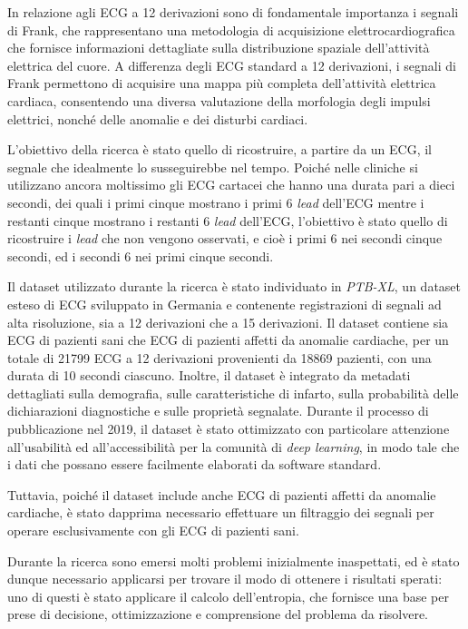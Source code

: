 In relazione agli ECG a 12 derivazioni sono di fondamentale importanza i segnali di Frank, che rappresentano una metodologia di acquisizione elettrocardiografica che fornisce informazioni dettagliate sulla distribuzione spaziale dell'attività elettrica del cuore. A differenza degli ECG standard a 12 derivazioni, i segnali di Frank permettono di acquisire una mappa più completa dell'attività elettrica cardiaca, consentendo una diversa valutazione della morfologia degli impulsi elettrici, nonché delle anomalie e dei disturbi cardiaci.

L'obiettivo della ricerca è stato quello di ricostruire, a partire da un ECG, il segnale che idealmente lo susseguirebbe nel tempo. Poiché nelle cliniche si utilizzano ancora moltissimo gli ECG cartacei che hanno una durata pari a dieci secondi, dei quali i primi cinque mostrano i primi 6 \textit{lead} dell'ECG mentre i restanti cinque mostrano i restanti 6 \textit{lead} dell'ECG, l'obiettivo è stato quello di ricostruire i \textit{lead} che non vengono osservati, e cioè i primi 6 nei secondi cinque secondi, ed i secondi 6 nei primi cinque secondi.

Il dataset utilizzato durante la ricerca è stato individuato in \textit{PTB-XL}, un dataset esteso di ECG sviluppato in Germania e contenente registrazioni di segnali ad alta risoluzione, sia a 12 derivazioni che a 15 derivazioni. Il dataset contiene sia ECG di pazienti sani che ECG di pazienti affetti da anomalie cardiache, per un totale di 21799 ECG a 12 derivazioni provenienti da 18869 pazienti, con una durata di 10 secondi ciascuno. Inoltre, il dataset è integrato da metadati dettagliati sulla demografia, sulle caratteristiche di infarto, sulla probabilità delle dichiarazioni diagnostiche e sulle proprietà segnalate. Durante il processo di pubblicazione nel 2019, il dataset è stato ottimizzato con particolare attenzione all'usabilità ed all'accessibilità per la comunità di \textit{deep learning}, in modo tale che i dati che possano essere facilmente elaborati da software standard.

Tuttavia, poiché il dataset include anche ECG di pazienti affetti da anomalie cardiache, è stato dapprima necessario effettuare un filtraggio dei segnali per operare esclusivamente con gli ECG di pazienti sani.

Durante la ricerca sono emersi molti problemi inizialmente inaspettati, ed è stato dunque necessario applicarsi per trovare il modo di ottenere i risultati sperati: uno di questi è stato applicare il calcolo dell'entropia, che fornisce una base per prese di decisione, ottimizzazione e comprensione del problema da risolvere.

